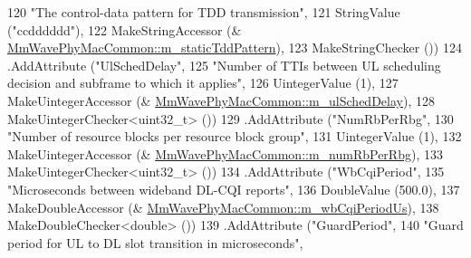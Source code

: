 \begin{DoxyCode}
120                                                    \textcolor{stringliteral}{"The control-data pattern for TDD transmission"},
121                                                    StringValue (\textcolor{stringliteral}{"ccdddddd"}),
122                                                    MakeStringAccessor (&
      \hyperlink{classns3_1_1MmWavePhyMacCommon_a535f573b6fadcaa0db66d543d4eaf6c3}{MmWavePhyMacCommon::m\_staticTddPattern}),
123                                                    MakeStringChecker ())
124                   .AddAttribute (\textcolor{stringliteral}{"UlSchedDelay"},
125                                                          \textcolor{stringliteral}{"Number of TTIs between UL scheduling decision and
       subframe to which it applies"},
126                                                          UintegerValue (1),
127                                                          MakeUintegerAccessor (&
      \hyperlink{classns3_1_1MmWavePhyMacCommon_ae81ae7fdf0624e2384178c40c5362f39}{MmWavePhyMacCommon::m\_ulSchedDelay}),
128                                                          MakeUintegerChecker<uint32\_t> ())
129                   .AddAttribute (\textcolor{stringliteral}{"NumRbPerRbg"},
130                                                          \textcolor{stringliteral}{"Number of resource blocks per resource block
       group"},
131                                                          UintegerValue (1),
132                                                          MakeUintegerAccessor (&
      \hyperlink{classns3_1_1MmWavePhyMacCommon_a140ad0d28db2240d5b267050843594fd}{MmWavePhyMacCommon::m\_numRbPerRbg}),
133                                                          MakeUintegerChecker<uint32\_t> ())
134                         .AddAttribute (\textcolor{stringliteral}{"WbCqiPeriod"},
135                                                          \textcolor{stringliteral}{"Microseconds between wideband DL-CQI reports"},
136                                                          DoubleValue (500.0),
137                                                          MakeDoubleAccessor (&
      \hyperlink{classns3_1_1MmWavePhyMacCommon_a51c7d963b55442020bb4d54074fca3eb}{MmWavePhyMacCommon::m\_wbCqiPeriodUs}),
138                                                          MakeDoubleChecker<double> ())
139                  .AddAttribute (\textcolor{stringliteral}{"GuardPeriod"},
140                                                          \textcolor{stringliteral}{"Guard period for UL to DL slot transition in
       microseconds"},

\end{DoxyCode}
